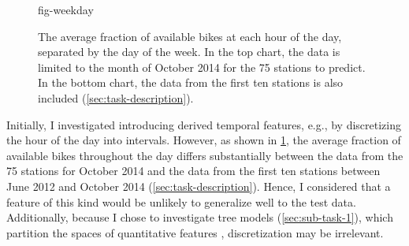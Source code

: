 \begin{figure}
  \centering
  {fig-weekday}
  \caption{
    The average fraction of available bikes at each hour of the day, separated by the day of the week.
    In the top chart, the data is limited to the month of October 2014 for the 75 stations
    to predict.
    In the bottom chart, the data from the first ten stations is also included
    (\cref{sec:task-description}).
  }
  \label{fig-weekday}
\end{figure}

Initially, I investigated introducing derived temporal features, e.g., by discretizing
the hour of the day into intervals.
However, as shown in \cref{fig-weekday}, the average fraction of available bikes
throughout the day differs substantially between the data from the 75 stations for
October 2014 and the data from the first ten stations between June 2012 and October
2014 (\cref{sec:task-description}).
Hence, I considered that a feature of this kind would be unlikely to generalize well to
the test data.
Additionally, because I chose to investigate tree models (\cref{sec:sub-task-1}), which
partition the spaces of quantitative features \parencite[155]{Flach2012},
discretization may be irrelevant.

